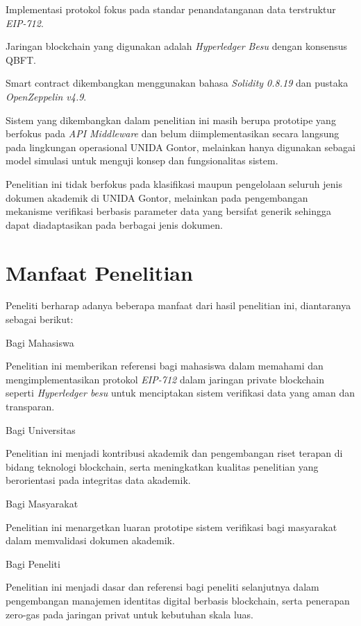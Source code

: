 	\begin{secenumerate}
		\item Implementasi protokol fokus pada standar penandatanganan data terstruktur \textit{EIP-712}.
		\item Jaringan blockchain yang digunakan adalah \textit{Hyperledger Besu} dengan konsensus QBFT.
		\item Smart contract dikembangkan menggunakan bahasa \textit{Solidity 0.8.19} dan pustaka \textit{OpenZeppelin v4.9}.
		\item Sistem yang dikembangkan dalam penelitian ini masih berupa prototipe yang berfokus pada \textit{API Middleware} dan belum diimplementasikan secara langsung pada lingkungan operasional UNIDA Gontor, melainkan hanya digunakan sebagai model simulasi untuk menguji konsep dan fungsionalitas sistem.
		\item Penelitian ini tidak berfokus pada klasifikasi maupun pengelolaan seluruh jenis dokumen akademik di UNIDA Gontor, melainkan pada pengembangan mekanisme verifikasi berbasis parameter data yang bersifat generik sehingga dapat diadaptasikan pada berbagai jenis dokumen. 

	\end{secenumerate}
		
	\section{Manfaat Penelitian}
	Peneliti berharap adanya beberapa manfaat dari hasil penelitian ini, diantaranya sebagai berikut:
		\begin{secenumerate}
			\item Bagi Mahasiswa
			
			Penelitian ini memberikan referensi bagi mahasiswa dalam memahami dan mengimplementasikan protokol \textit{EIP-712} dalam jaringan private blockchain seperti \textit{Hyperledger besu} untuk menciptakan sistem verifikasi data yang aman dan transparan.

			\item Bagi Universitas
			
			Penelitian ini menjadi kontribusi akademik dan pengembangan riset terapan di bidang teknologi blockchain, serta meningkatkan kualitas penelitian yang berorientasi pada integritas data akademik.

			\item Bagi Masyarakat
			
			Penelitian ini menargetkan luaran prototipe sistem verifikasi bagi masyarakat dalam memvalidasi dokumen akademik.

			\item Bagi Peneliti
			
			Penelitian ini menjadi dasar dan referensi bagi peneliti selanjutnya dalam pengembangan manajemen identitas digital berbasis blockchain, serta penerapan  zero-gas pada jaringan privat untuk kebutuhan skala luas.
		\end{secenumerate}
	
